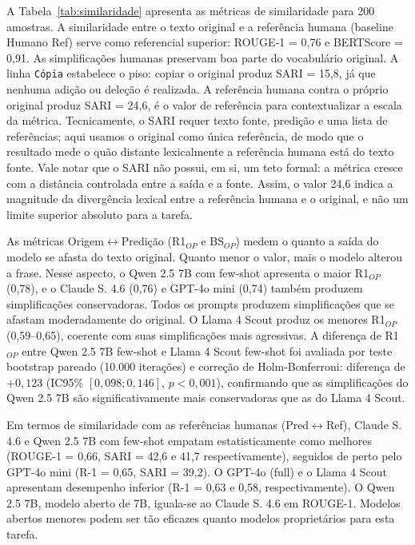 \documentclass[a4paper, twocolumn, 11pt, twoside]{article}
\begin{document}
A Tabela~\ref{tab:similaridade} apresenta as métricas de similaridade
para 200 amostras. A similaridade entre o texto original e a referência
humana (baseline Humano Ref) serve como referencial superior:
ROUGE-1 = 0,76 e BERTScore = 0,91. As simplificações
humanas preservam boa parte do vocabulário original. A linha {\tt Cópia}
estabelece o piso: copiar o original produz SARI = 15,8, já que nenhuma
adição ou deleção é realizada. A referência humana contra o próprio
original produz SARI = 24,6, é o valor de referência
para contextualizar a escala da métrica. Tecnicamente, o SARI
requer texto fonte, predição e uma lista de referências; aqui
usamos o original como única referência, de modo que o resultado
mede o quão distante lexicalmente a referência humana está do
texto fonte. Vale notar que o SARI não possui, em si, um
teto formal: a métrica cresce com a distância controlada entre
a saída e a fonte. Assim, o valor 24,6 indica a magnitude da
divergência lexical entre a referência humana e o original, e
não um limite superior absoluto para a tarefa.

As métricas Origem$\leftrightarrow$Predição (R1$_{OP}$ e BS$_{OP}$)
medem o quanto a saída do modelo se afasta do texto original. Quanto
menor o valor, mais o modelo alterou a frase. Nesse aspecto, o
Qwen 2.5 7B com few-shot apresenta o maior R1$_{OP}$
(0,78), e o Claude S. 4.6 (0,76) e GPT-4o mini (0,74) também produzem
simplificações conservadoras. Todos os prompts produzem simplificações que se afastam
moderadamente do original. O Llama 4 Scout produz os
menores R1$_{OP}$ (0,59--0,65), coerente com suas simplificações mais
agressivas. A diferença de R1$_{OP}$ entre Qwen 2.5 7B
few-shot e Llama 4 Scout few-shot foi avaliada
por teste bootstrap pareado (10.000 iterações) e correção de
Holm-Bonferroni: diferença de $+0{,}123$ (IC95\%
$[0{,}098; 0{,}146]$, $p < 0{,}001$), confirmando que as
simplificações do Qwen 2.5 7B são significativamente mais
conservadoras que as do Llama 4 Scout.

Em termos de similaridade com as referências humanas
(Pred$\leftrightarrow$Ref),
Claude S. 4.6 e Qwen 2.5 7B com few-shot empatam estatisticamente como
melhores (ROUGE-1 =
0,66, SARI = 42,6 e 41,7 respectivamente), seguidos de perto pelo
GPT-4o mini (R-1 = 0,65, SARI = 39,2). O GPT-4o (full) e o Llama 4
Scout apresentam desempenho inferior (R-1 = 0,63 e 0,58,
respectivamente). O Qwen 2.5 7B, modelo aberto de 7B, iguala-se ao
Claude S. 4.6 em ROUGE-1. Modelos abertos menores
podem ser tão eficazes quanto modelos proprietários para esta
tarefa.
\end{document}

